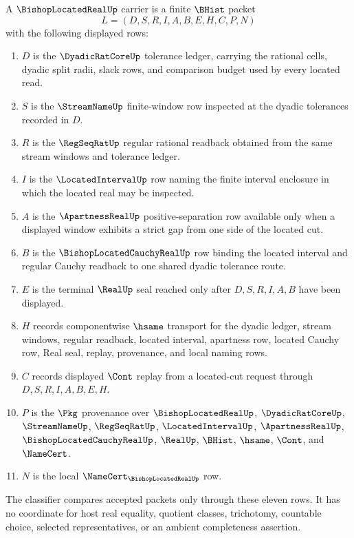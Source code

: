 \begin{definition}
\label{def:bishop-located-real-carrier}
A $\BishopLocatedRealUp$ carrier is a finite $\BHist$ packet
$$
L=(D,S,R,I,A,B,E,H,C,P,N)
$$
with the following displayed rows:
\begin{enumerate}
\item $D$ is the $\DyadicRatCoreUp$ tolerance ledger, carrying the rational cells, dyadic split radii, slack rows, and comparison budget used by every located read.
\item $S$ is the $\StreamNameUp$ finite-window row inspected at the dyadic tolerances recorded in $D$.
\item $R$ is the $\RegSeqRatUp$ regular rational readback obtained from the same stream windows and tolerance ledger.
\item $I$ is the $\LocatedIntervalUp$ row naming the finite interval enclosure in which the located real may be inspected.
\item $A$ is the $\ApartnessRealUp$ positive-separation row available only when a displayed window exhibits a strict gap from one side of the located cut.
\item $B$ is the $\BishopLocatedCauchyRealUp$ row binding the located interval and regular Cauchy readback to one shared dyadic tolerance route.
\item $E$ is the terminal $\RealUp$ seal reached only after $D,S,R,I,A,B$ have been displayed.
\item $H$ records componentwise $\hsame$ transport for the dyadic ledger, stream windows, regular readback, located interval, apartness row, located Cauchy row, Real seal, replay, provenance, and local naming rows.
\item $C$ records displayed $\Cont$ replay from a located-cut request through $D,S,R,I,A,B,E,H$.
\item $P$ is the $\Pkg$ provenance over $\BishopLocatedRealUp$, $\DyadicRatCoreUp$, $\StreamNameUp$, $\RegSeqRatUp$, $\LocatedIntervalUp$, $\ApartnessRealUp$, $\BishopLocatedCauchyRealUp$, $\RealUp$, $\BHist$, $\hsame$, $\Cont$, and $\NameCert$.
\item $N$ is the local $\NameCert_{\BishopLocatedRealUp}$ row.
\end{enumerate}
The classifier compares accepted packets only through these eleven rows. It has no coordinate for host real equality, quotient classes, trichotomy, countable choice, selected representatives, or an ambient completeness assertion.
\end{definition}

